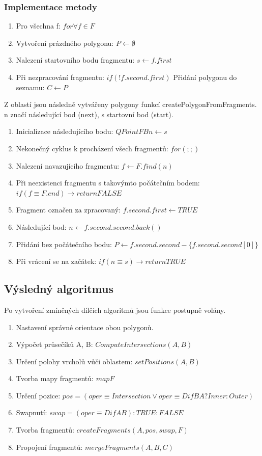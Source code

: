 \documentclass[a4paper, 12pt]{article}
\begin{document}
\subsubsection{Implementace metody}
\begin{enumerate}
\item Pro všechna f: $ for \forall f \in F$
\item Vytvoření prázdného polygonu: $P \leftarrow \emptyset$
\item Nalezení startovního bodu fragmentu: $s \leftarrow f.first$
\item Při nezpracování fragmentu: $if (!f.second.first)$
\subitem Přidání polygonu do seznamu: $C \leftarrow P$
\end{enumerate}

Z oblastí jsou následně vytvářeny polygony funkcí createPolygonFromFragments. n značí následující bod (next), s startovní bod (start). 

\begin{enumerate}
\item Inicializace následujícího bodu: $QPointFB n \leftarrow s$
\item Nekonečný cyklus k procházení všech fragmentů: $for(;;)$
\item Nalezení navazujícího fragmentu: $f \leftarrow F.find(n)$
\item Při neexistenci fragmentu s takovýmto počátečním bodem: $if(f \equiv F.end) \rightarrow return FALSE$
\item Fragment označen za zpracovaný: $f.second.first \leftarrow TRUE$
\item Následující bod: $n \leftarrow f.second.second.back()$
\item Přidání bez počátečního bodu: $P \leftarrow f.second.second - \{ f.second.second[0]\} $
\item Při vrácení se na začátek: $if (n \equiv s) \rightarrow return TRUE$
\end{enumerate}

\subsection{Výsledný algoritmus}
Po vytvoření zmíněných dílčích algoritmů jsou funkce postupně volány.

\begin{enumerate}
\item Nastavení správné orientace obou polygonů.
\item Výpočet průsečíků A, B: $ComputeIntersections(A, B)$
\item Určení polohy vrcholů vůči oblastem: $setPositions(A, B) $
\item Tvorba mapy fragmentů: $map F$
\item Určení pozice: $pos = (oper \equiv Intersection \lor oper \equiv DifBA?Inner:Outer ) $
\item Swapnutí: $swap = (oper \equiv DifAB) : TRUE : FALSE$
\item Tvorba fragmentů: $createFragments(A, pos, swap, F)$
\item Propojení fragmentů: $mergeFragments(A, B, C)$
\end{enumerate}
\end{document}
